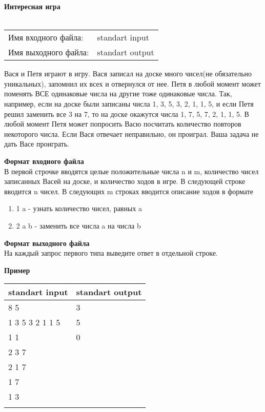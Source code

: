 \documentclass[10pt, a4paper]{article}
\begin{document}
	{\selectfont
		\noindent\LARGE\textbf{Интересная игра}\\\\
		\normalsize
		\begin{tabular}{ll}
			\indent Имя входного файла: & standart input\\
			\indent Имя выходного файла: & standart output\\
		\end{tabular}
		
		\noindent Вася и Петя играют в игру. Вася записал на доске много чисел(не обязательно уникальных), запомнил их всех и отвернулся от нее. Петя в любой момент может поменять ВСЕ одинаковые числа на другие тоже одинаковые числа. Так, например, если на доске были записаны числа 1, 3, 5, 3, 2, 1, 1, 5, и если Петя решил заменить все 3 на 7, то на доске окажутся числа 1, 7, 5, 7, 2, 1, 1, 5. В любой момент Петя может попросить Васю посчитать количество повторов некоторого числа. Если Вася отвечает неправильно, он проиграл. Ваша задача не дать Васе проиграть.
		
		\noindent\large\textbf{Формат входного файла}\\
		\normalsize В первой строчке вводятся целые положительные числа n и m, количество чисел записанных Васей на доске, и количество ходов в игре. В следующей строке вводится n чисел. В следующих m строках вводится описание ходов в формате 
		\begin{enumerate}
				\item 1 a - узнать количество чисел, равных a
				\item 2 a b - заменить все числа a на числа b
		\end{enumerate}
		
		\noindent\large\textbf{Формат выходного файла}\\\normalsize На каждый запрос первого типа выведите ответ в отдельной строке. 
		
		\noindent\large\textbf{Пример}\normalsize
		
		\noindent\begin{tabular}{|p{5,5cm}|p{}|}
			\hline
			\multicolumn{1}{|c|}{standart input} & \multicolumn{1}{c|}{standart output}\\\hline
			8 5 & 3 \\
			1 3 5 3 2 1 1 5 & 5 \\
			1 1 & 0\\
			2 3 7 & \\
			2 1 7 & \\
			1 7 & \\
			1 3 & \\
			& \\\hline
		\end{tabular}
		
	}
	
\end{document}
